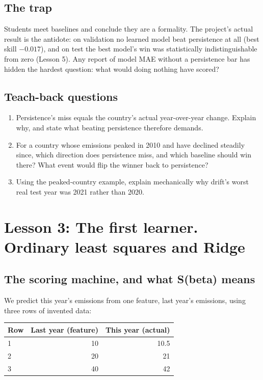 \documentclass[11pt]{article}
\begin{document}
\subsection{The trap}

Students meet baselines and conclude they are a formality. The project's
actual result is the antidote: on validation no learned model beat
persistence at all (best skill $-0.017$), and on test the best model's
win was statistically indistinguishable from zero (Lesson 5). Any report
of model MAE without a persistence bar has hidden the hardest question:
what would doing nothing have scored?

\subsection{Teach-back questions}

\begin{enumerate}
\item Persistence's miss equals the country's actual year-over-year
change. Explain why, and state what beating persistence therefore demands.
\item For a country whose emissions peaked in 2010 and have declined
steadily since, which direction does persistence miss, and which baseline
should win there? What event would flip the winner back to persistence?
\item Using the peaked-country example, explain mechanically why drift's
worst real test year was 2021 rather than 2020.
\end{enumerate}

\section{Lesson 3: The first learner. Ordinary least squares and Ridge}

\subsection{The scoring machine, and what S(beta) means}

We predict this year's emissions from one feature, last year's emissions,
using three rows of invented data:

\begin{center}
\begin{tabular}{lrr}
\toprule
Row & Last year (feature) & This year (actual) \\
\midrule
1 & 10 & 10.5 \\
2 & 20 & 21 \\
3 & 40 & 42 \\
\bottomrule
\end{tabular}
\end{center}
\end{document}
